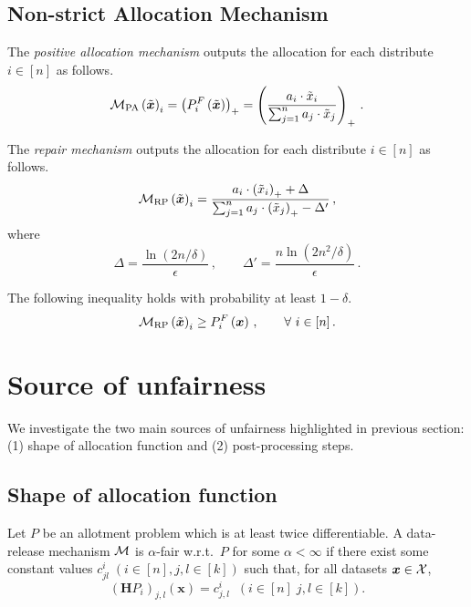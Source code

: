 \subsection*{Non-strict Allocation Mechanism}
\begin{definition}
	The \emph{positive allocation mechanism}
	outputs the allocation for each distribute $i\in [n]$ as follows.
	\begin{equation*}
		\mathcal{M}_{\mathrm{PA}}\left(\tilde{\bm{x}}\right)_i  =  \left(P^F_{i}\left(\tilde{\bm{x}}\right)\right)_+= \left(\frac{a_i\cdot \tilde{x}_i}{\sum_{j=1}^n a_j\cdot \tilde{x}_j}\right)_+\,.
	\end{equation*}
\end{definition}
\begin{definition}
	The \emph{repair mechanism} outputs the allocation for each distribute $i\in [n]$ as follows.
	\begin{equation*}
		\mathcal{M}_{\mathrm{RP}}\left(\tilde{\bm{x}}\right)_i  = \frac{a_i\cdot \left(\tilde{x}_i\right)_++\Delta}{\sum_{j=1}^n a_j\cdot \left(\tilde{x}_j\right)_+ - \Delta'}\,,
	\end{equation*}
	where
	\begin{equation*}
		\Delta= \frac{\ln\left(2n/\delta\right)}{\epsilon}\,,\qquad\Delta' =
		\frac{n\ln\left(2n^2/\delta\right)}{\epsilon}\,.
	\end{equation*}
\end{definition}

\begin{proposition}
	The following inequality holds with probability at least $1-\delta$.
	\begin{equation*}
		\mathcal{M}_{\mathrm{RP}}\left(\tilde{\bm{x}}\right)_i\geq P^F_{i}\left(\bm{x}\right)\,,\qquad\forall~i\in[n]\,.
	\end{equation*}
\end{proposition}


\section*{Source of unfairness}
We investigate the two main sources of unfairness highlighted in previous section: (1) shape of allocation function and (2) post-processing steps.
\subsection*{Shape of allocation function}

\begin{theorem}
	\label{lem:fair_bound_allottments}
	Let $P$ be an allotment problem which is at least twice differentiable.
	A data-release mechanism $\mathcal{M}$ is $\alpha$-fair w.r.t.~$P$ for some
	$\alpha < \infty$ if there exist some constant values
	$c^i_{jl} \; (i \in [n], j,l \in [k])$ such that, for all datasets $\bm{x} \in \mathcal{X}$,
	\[
		(\bm{H}P_i)_{j,l}(\bm{x}) = c^i_{j,l}   \;\; (i\in[n]\; j,l\in[k]).
	\]
\end{theorem}

